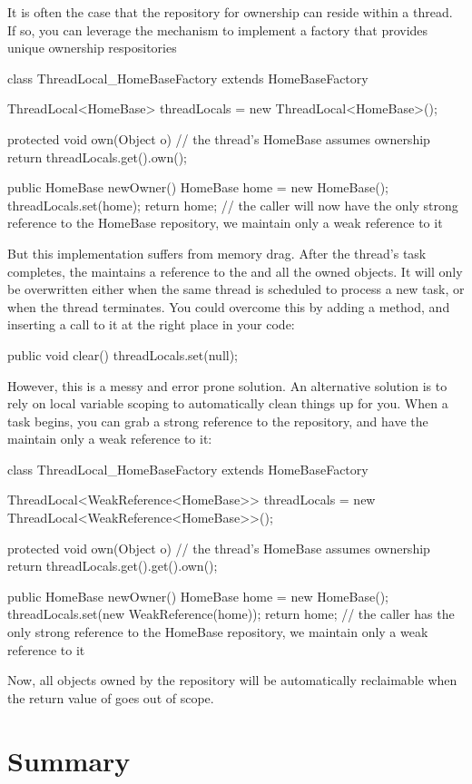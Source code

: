 It is often the case that the repository for ownership can reside within a
thread. If so, you can leverage the \tls mechanism to implement
a factory that provides unique ownership respositories
\begin{shortlisting}
class ThreadLocal_HomeBaseFactory extends HomeBaseFactory {
   ThreadLocal<HomeBase> threadLocals = new ThreadLocal<HomeBase>();
   
   protected void own(Object o) {
      // the thread's HomeBase assumes ownership
      return threadLocals.get().own();
   }

   public HomeBase newOwner() {
      HomeBase home = new HomeBase();
      threadLocals.set(home);
      return home;
      // the caller will now have the only strong reference to the HomeBase repository, we maintain only a weak reference to it
   }
}
\end{shortlisting}

But this implementation suffers from memory drag. After the thread's task
completes, the \tls maintains a reference to the  and
all the owned objects. It will only be overwritten either when the same thread is
scheduled to process a new task, or when the thread terminates. You could
overcome this by adding a  method, and inserting a call to it at the
right place in your code:
\begin{shortlisting}
public void clear() {
   threadLocals.set(null);
}
\end{shortlisting}
However, this is a messy and error prone solution. An alternative solution is to
rely on local variable scoping to automatically clean things up for you. When a
task begins, you can grab a strong reference to the 
repository, and have the \tls maintain only a weak reference to
it:
\begin{shortlisting}
class ThreadLocal_HomeBaseFactory extends HomeBaseFactory {
   ThreadLocal<WeakReference<HomeBase>> threadLocals = new ThreadLocal<WeakReference<HomeBase>>();
      
   protected void own(Object o) {
      // the thread's HomeBase assumes ownership
      return threadLocals.get().get().own();
   }
   
   public HomeBase newOwner() {
      HomeBase home = new HomeBase();
      threadLocals.set(new WeakReference(home));
      return home;
      // the caller has the only strong reference to the HomeBase repository, we maintain only a weak reference to it
   }
}
\end{shortlisting}
Now, all objects owned by the repository will be automatically reclaimable when
the return value of  goes out of scope.

\section{Summary}



